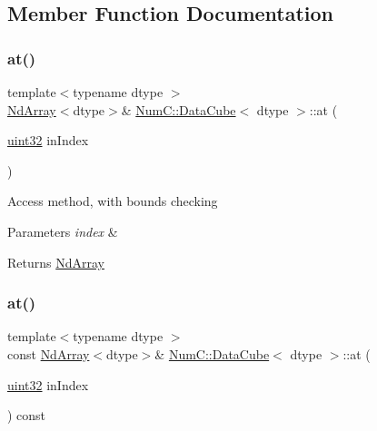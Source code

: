 \subsection{Member Function Documentation}
\mbox{\label{class_num_c_1_1_data_cube_afe1b1ed736d07365f07b92652f484561}} 
\subsubsection{\texorpdfstring{at()}{at()}\hspace{0.1cm}{\footnotesize\ttfamily [1/2]}}
{\footnotesize\ttfamily template$<$typename dtype $>$ \\
\mbox{\hyperlink{class_num_c_1_1_nd_array}{Nd\+Array}}$<$dtype$>$\& \mbox{\hyperlink{class_num_c_1_1_data_cube}{Num\+C\+::\+Data\+Cube}}$<$ dtype $>$\+::at (\begin{DoxyParamCaption}\item[{\mbox{\hyperlink{namespace_num_c_ae685802ca6d3035f2b400b081e3953fa}{uint32}}}]{in\+Index }\end{DoxyParamCaption})\hspace{0.3cm}{\ttfamily [inline]}}

Access method, with bounds checking


\begin{DoxyParams}{Parameters}
{\em index} & \\
\hline
\end{DoxyParams}
\begin{DoxyReturn}{Returns}
\mbox{\hyperlink{class_num_c_1_1_nd_array}{Nd\+Array}} 
\end{DoxyReturn}
\mbox{\label{class_num_c_1_1_data_cube_a53b0e0f624cc31c5f9bf403386181a96}} 
\subsubsection{\texorpdfstring{at()}{at()}\hspace{0.1cm}{\footnotesize\ttfamily [2/2]}}
{\footnotesize\ttfamily template$<$typename dtype $>$ \\
const \mbox{\hyperlink{class_num_c_1_1_nd_array}{Nd\+Array}}$<$dtype$>$\& \mbox{\hyperlink{class_num_c_1_1_data_cube}{Num\+C\+::\+Data\+Cube}}$<$ dtype $>$\+::at (\begin{DoxyParamCaption}\item[{\mbox{\hyperlink{namespace_num_c_ae685802ca6d3035f2b400b081e3953fa}{uint32}}}]{in\+Index }\end{DoxyParamCaption}) const\hspace{0.3cm}{\ttfamily [inline]}}

